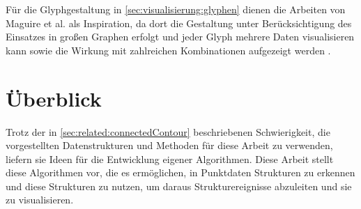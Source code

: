 Für die Glyphgestaltung in \autoref{sec:visualisierung:glyphen} dienen die Arbeiten von Maguire et al. als Inspiration, da dort die Gestaltung unter Berücksichtigung des Einsatzes in großen Graphen erfolgt und jeder Glyph mehrere Daten visualisieren kann \cite{maguire2013visualCompression} sowie die Wirkung mit zahlreichen Kombinationen aufgezeigt werden \cite{maguire2012taxonomyBasedGlyphDesign}.


\chapter{Überblick}

Trotz der in \autoref{sec:related:connectedContour} beschriebenen Schwierigkeit, die vorgestellten Datenstrukturen und Methoden für diese Arbeit zu verwenden, liefern sie Ideen für die Entwicklung eigener Algorithmen. Diese Arbeit stellt diese Algorithmen vor, die es ermöglichen, in Punktdaten Strukturen zu erkennen und diese Strukturen zu nutzen, um daraus Strukturereignisse abzuleiten und sie zu visualisieren.



